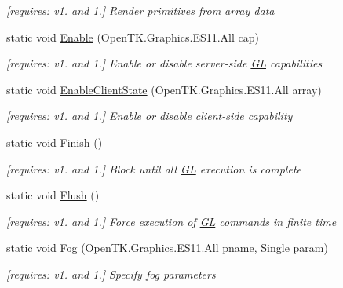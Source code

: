 \begin{DoxyCompactItemize}
\begin{DoxyCompactList}\small\item\em \mbox{[}requires\-: v1. and 1.\mbox{]} Render primitives from array data \end{DoxyCompactList}\item 
static void \hyperlink{class_open_t_k_1_1_graphics_1_1_e_s11_1_1_g_l_a230b9fcc52e411f03f08244750689e75}{Enable} (Open\-T\-K.\-Graphics.\-E\-S11.\-All cap)
\begin{DoxyCompactList}\small\item\em \mbox{[}requires\-: v1. and 1.\mbox{]} Enable or disable server-\/side \hyperlink{class_open_t_k_1_1_graphics_1_1_e_s11_1_1_g_l}{G\-L} capabilities \end{DoxyCompactList}\item 
static void \hyperlink{class_open_t_k_1_1_graphics_1_1_e_s11_1_1_g_l_a27746a36c756a6dacc45a53364061589}{Enable\-Client\-State} (Open\-T\-K.\-Graphics.\-E\-S11.\-All array)
\begin{DoxyCompactList}\small\item\em \mbox{[}requires\-: v1. and 1.\mbox{]} Enable or disable client-\/side capability \end{DoxyCompactList}\item 
static void \hyperlink{class_open_t_k_1_1_graphics_1_1_e_s11_1_1_g_l_a0f89f072d9f3f061bcb1fae830c0b20c}{Finish} ()
\begin{DoxyCompactList}\small\item\em \mbox{[}requires\-: v1. and 1.\mbox{]} Block until all \hyperlink{class_open_t_k_1_1_graphics_1_1_e_s11_1_1_g_l}{G\-L} execution is complete \end{DoxyCompactList}\item 
static void \hyperlink{class_open_t_k_1_1_graphics_1_1_e_s11_1_1_g_l_ac39b56b7c3c6d124d990ba60d26b4c10}{Flush} ()
\begin{DoxyCompactList}\small\item\em \mbox{[}requires\-: v1. and 1.\mbox{]} Force execution of \hyperlink{class_open_t_k_1_1_graphics_1_1_e_s11_1_1_g_l}{G\-L} commands in finite time \end{DoxyCompactList}\item 
static void \hyperlink{class_open_t_k_1_1_graphics_1_1_e_s11_1_1_g_l_adde3cd8d55a925bd818cae566c63be2f}{Fog} (Open\-T\-K.\-Graphics.\-E\-S11.\-All pname, Single param)
\begin{DoxyCompactList}\small\item\em \mbox{[}requires\-: v1. and 1.\mbox{]} Specify fog parameters \end{DoxyCompactList}\item 

\end{DoxyCompactItemize}
